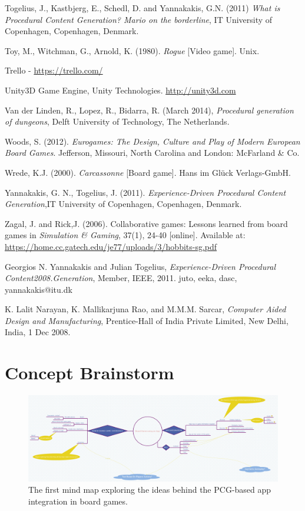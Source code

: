 \documentclass[a4paper,11pt]{report}
\begin{document}
\begin{thebibliography}{1}
Togelius, J., Kastbjerg, E., Schedl, D. and Yannakakis, G.N. (2011) \emph{What is Procedural Content Generation? Mario on the borderline}, IT University of Copenhagen, Copenhagen, Denmark.

Toy, M., Witchman, G., Arnold, K. (1980). \textit{Rogue} [Video game]. Unix.

Trello - \url{https://trello.com/}


Unity3D Game Engine, Unity Technologies.
\url{http://unity3d.com}

Van der Linden, R., Lopez, R., Bidarra, R. (March 2014), \textit{Procedural generation of dungeons}, Delft University of Technology, The Netherlands.

Woods, S. (2012). \textit{Eurogames: The Design, Culture and Play of Modern European Board Games}. Jefferson, Missouri, North Carolina and London: McFarland \& Co.

Wrede, K.J. (2000). \textit{Carcassonne} [Board game]. Hans im Glück Verlags-GmbH.

Yannakakis, G. N., Togelius, J. (2011). \textit{Experience-Driven Procedural Content Generation},IT University of Copenhagen, Copenhagen, Denmark.

Zagal, J. and Rick,J. (2006). Collaborative games: Lessons learned from board games in \textit{Simulation \& Gaming}, 37(1), 24-40 [online]. Available at: \url{https://home.cc.gatech.edu/je77/uploads/3/hobbits-sg.pdf}

Georgios N. Yannakakis and Julian Togelius, \emph{Experience-Driven Procedural Content2008.Generation}, Member, IEEE, 2011.
{juto, eeka, dasc, yannakakis}@itu.dk

K. Lalit Narayan, K. Mallikarjuna Rao, and M.M.M. Sarcar, \emph{Computer Aided Design and Manufacturing}, Prentice-Hall of India Private Limited, New Delhi, India, 1 Dec 2008.

\end{thebibliography}
\pagebreak
\appendix
\chapter{Concept Brainstorm}
\begin{figure}[h]
    \centering
    \includegraphics[scale=0.18,angle=-90]{Images/Brainstorm1.png}
    \caption{The first mind map exploring the ideas behind the PCG-based app integration in board games.}
    \label{fig:brainstorm1}
\end{figure}
\end{document}
